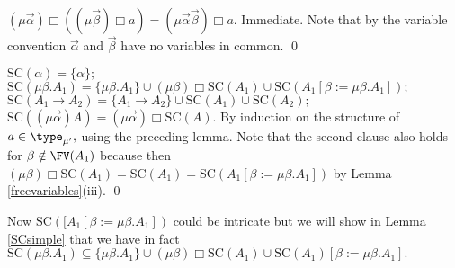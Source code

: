 \documentclass[11pt,aslarticle,xperspectives,bibay3]{asl}
\newcommand\tamua{\type_{\mu'}}
\newcommand\alphaarrow{\vec{\alpha}}
\newcommand\betaarrow{\vec{\beta}}
\newcommand\SC{{\mbox {SC}}}
\begin{document}
{\blem\label{mualpharestricted}  $(\mu\alphaarrow)\Box((\mu\betaarrow)\Box a) =(\mu\alphaarrow\betaarrow)\Box a.$
\elem
\bpf  Immediate. Note that by the variable convention $\alphaarrow$ and $\betaarrow$ have no variables in common. \qed
\epf

\blem\label{SC} 
$\SC(\alpha)=\{\alpha\};$\\
$\SC(\mu\beta.A_1)=\{\mu\beta.A_1\}\cup(\mu\beta)\Box\SC(A_1)\cup\SC(A_1[\beta :=\mu\beta.A_1]);$\\
$\SC(A_1\to A_2)=\{A_1\to A_2\}\cup\SC(A_1)\cup\SC(A_2);$\\
$\SC((\mu\alphaarrow)A)= (\mu\alphaarrow)\Box\SC(A).$
\elem
\bpf By induction on the structure of $a\in\tamua,$ using the preceding lemma. Note that the second clause also holds for $\beta\notin\FV(A_1)$ because then $(\mu\beta)\Box\SC(A_1)=\SC(A_1) =\SC(A_1[\beta :=\mu\beta.A_1])$ by Lemma \ref{freevariables}(iii). \qed
\epf

Now $\SC([A_1[\beta :=\mu\beta.A_1])$ could be intricate but we will show in Lemma \ref{SCsimple} that we have in fact $\SC(\mu\beta.A_1)\subseteq\{\mu\beta.A_1\}\cup(\mu\beta)\Box\SC(A_1)\cup\SC(A_1)[\beta :=\mu\beta.A_1].$

}
\end{document}
